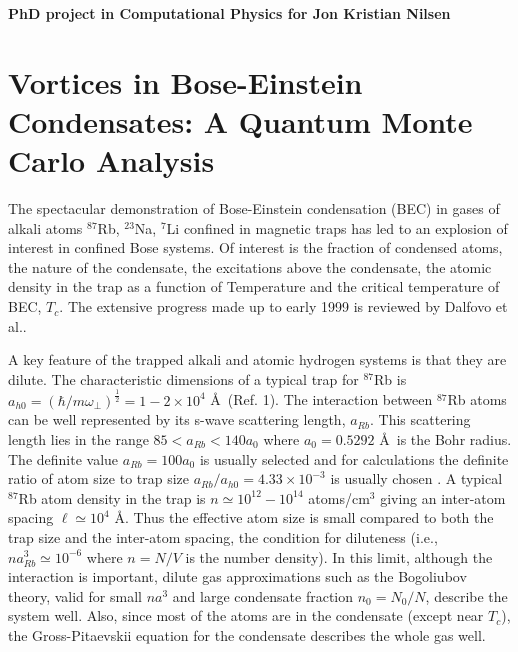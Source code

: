 


\pagestyle{plain}

\begin{center} \huge \bf PhD project in Computational Physics 
for Jon Kristian Nilsen \end{center}

\section*{Vortices in Bose-Einstein Condensates: A Quantum Monte Carlo Analysis}

The spectacular demonstration of Bose-Einstein condensation (BEC) in gases of
alkali atoms $^{87}$Rb, $^{23}$Na, $^7$Li confined in magnetic
traps\cite{anderson95,davis95,bradley95} has led to an explosion of interest in
confined Bose systems. Of interest is the fraction of condensed atoms, the
nature of the condensate, the excitations above the condensate, the atomic
density in the trap as a function of Temperature and the critical temperature of BEC,
$T_c$. The extensive progress made up to early 1999 is reviewed by Dalfovo et
al.\cite{dalfovo99}.

A key feature of the trapped alkali and atomic hydrogen systems is that they are
dilute. The characteristic dimensions of a typical trap for $^{87}$Rb is
$a_{h0}=\left( {\hbar}/{m\omega_\perp}\right)^\frac{1}{2}=1-2 \times 10^4$
\AA\ (Ref. 1). The interaction between $^{87}$Rb atoms can be well represented
by its s-wave scattering length, $a_{Rb}$. This scattering length lies in the
range $85 < a_{Rb} < 140 a_0$ where $a_0 = 0.5292$ \AA\ is the Bohr radius.
The definite value $a_{Rb} = 100 a_0$ is usually selected and
for calculations the definite ratio of atom size to trap size 
$a_{Rb}/a_{h0} = 4.33 \times 10^{-3}$ 
is usually chosen \cite{dalfovo99}. A typical $^{87}$Rb atom
density in the trap is $n \simeq 10^{12}- 10^{14}$ atoms/cm$^3$ giving an
inter-atom spacing $\ell \simeq 10^4$ \AA. Thus the effective atom size is small
compared to both the trap size and the inter-atom spacing, the condition
for diluteness (i.e., $na^3_{Rb} \simeq 10^{-6}$ where $n = N/V$ is the number
density). In this limit,
although the interaction is important, dilute gas approximations such as the
Bogoliubov theory\cite{bogoliubov47}, valid for small $na^3$ and large
condensate fraction $n_0 = N_0/N$, describe the system well. Also, since most
of the atoms are in the condensate (except near $T_c$), the Gross-Pitaevskii
equation\cite{gross61,pitaevskii61} for the condensate describes the whole gas
well. 

